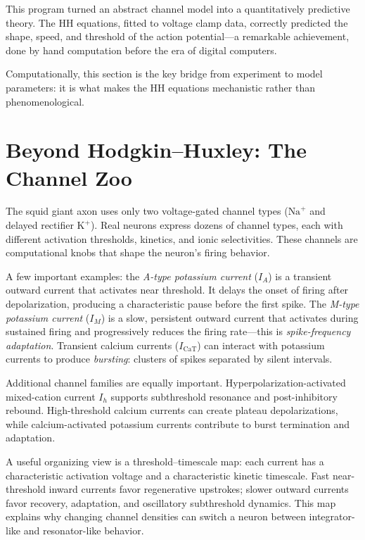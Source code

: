 This program turned an abstract channel model into a quantitatively predictive theory. The HH equations, fitted to voltage clamp data, correctly predicted the shape, speed, and threshold of the action potential---a remarkable achievement, done by hand computation before the era of digital computers.

Computationally, this section is the key bridge from experiment to model parameters: it is what makes the HH equations mechanistic rather than phenomenological.

\section{Beyond Hodgkin--Huxley: The Channel Zoo}
\label{sec:channel-zoo}

The squid giant axon uses only two voltage-gated channel types ($\text{Na}^+$ and delayed rectifier $\text{K}^+$). Real neurons express dozens of channel types, each with different activation thresholds, kinetics, and ionic selectivities. These channels are computational knobs that shape the neuron's firing behavior.

A few important examples: the \emph{A-type potassium current} ($I_A$) is a transient outward current that activates near threshold. It delays the onset of firing after depolarization, producing a characteristic pause before the first spike. The \emph{M-type potassium current} ($I_M$) is a slow, persistent outward current that activates during sustained firing and progressively reduces the firing rate---this is \emph{spike-frequency adaptation}. Transient calcium currents ($I_{\text{CaT}}$) can interact with potassium currents to produce \emph{bursting}: clusters of spikes separated by silent intervals.

Additional channel families are equally important. Hyperpolarization-activated mixed-cation current $I_h$ supports subthreshold resonance and post-inhibitory rebound. High-threshold calcium currents can create plateau depolarizations, while calcium-activated potassium currents contribute to burst termination and adaptation.

A useful organizing view is a threshold--timescale map: each current has a characteristic activation voltage and a characteristic kinetic timescale. Fast near-threshold inward currents favor regenerative upstrokes; slower outward currents favor recovery, adaptation, and oscillatory subthreshold dynamics. This map explains why changing channel densities can switch a neuron between integrator-like and resonator-like behavior.

